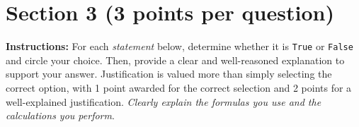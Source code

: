 \documentclass{article}
\newcommand{\blankbox}[2][3cm]{%
    \vspace{-0.5em}
    \begin{figure}[H]
        \makebox[\linewidth]{%
            \begin{tcolorbox}[
                colback=white,
                colframe=black,
                width=#2, %
                height=#1,
                boxrule=0.2mm
            ]
            \end{tcolorbox}
        }
    \end{figure}
    \vspace{-2em}
}
\begin{document}
\begin{comment}
\item  \underline{Question 2.5}: According to the sample data, what is the probability that a student’s political-news consumption is greater than or equal to 0.90 standard deviations above the sample mean? \emph{Justify your answer}. (\emph{Hint: Use the Z-score transformation equation to find the implicit value for $x$ when $Z=0.90$, given $\bar{x}$ and $s$)}
\blankbox[4cm]{1.06\textwidth}
\end{comment}

\newpage
\section*{Section 3 (3 points per question)}

\noindent\textbf{Instructions:}
For each \emph{statement} below, determine whether it is \texttt{True} or \texttt{False} and circle your choice. Then, provide a clear and well-reasoned explanation to support your answer. Justification is valued more than simply selecting the correct option, with 1 point awarded for the correct selection and 2 points for a well-explained justification. \emph{Clearly explain the formulas you use and the calculations you perform}.
\end{document}
